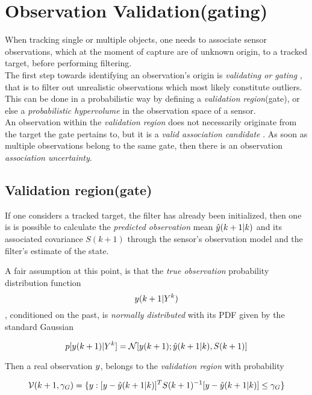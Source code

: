 \section{Observation Validation(gating)}


When tracking single or multiple objects, one needs to associate sensor observations, which at the moment of capture are of unknown origin, to a tracked target, before performing filtering.\\


The first step towards identifying an observation's origin is \emph{validating or gating} , that is to filter out unrealistic observations which most likely constitute outliers. This can be done in a probabilistic way by defining a \emph{validation region}(gate), or else a \emph{probabilistic hypervolume} in the observation space of a sensor. \\


An observation within the \emph{validation region}  does not necessarily originate from the target the gate pertains to, but it is a \emph{valid association candidate} . As soon as multiple observations belong to the same gate, then there is an observation \emph{association uncertainty}.

\subsection{Validation region(gate)}\label{ssec:validationregion}

If one considers a tracked target, \ie the filter has already been initialized, then one is is possible to calculate the \emph{predicted observation} mean ${\hat{{y}}}(k+1|k)$ and its associated covariance $S(k+1)$ through the sensor's observation model and the filter's estimate of the state.


A fair assumption at this point, is that the \emph{true observation} probability distribution function $$ {y}(k+1| {Y}^k)$$, conditioned on the past, is \emph{normally distributed} with its PDF given by the standard Gaussian

$$
p[{y}(k+1)|{Y}^k] = \mathcal{N}[{y}(k+1); {\hat{{y}}}(k+1|k), S(k+1)]
$$



Then a real observation ${y}$, belongs to the \emph{validation region} with probability


\begin{equation}\label{eq:gateEquation}
\mathcal{V}(k+1, {\gamma_G}) = \{{y}: [{y}-{\hat{{y}}}(k+1|k)]^T S(k+1)^{-1} [{y}-{\hat{{y}}}(k+1|k)] \leq {\gamma_G} \}
\end{equation}

